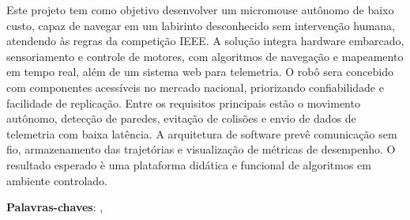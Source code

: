 \begin{resumo}
Este projeto tem como objetivo desenvolver um micromouse aut\^onomo de baixo custo, capaz de navegar em um labirinto desconhecido sem interven\c{c}\~ao humana, atendendo \`as regras da competi\c{c}\~ao IEEE. A solu\c{c}\~ao integra hardware embarcado, sensoriamento e controle de motores, com algoritmos de navega\c{c}\~ao e mapeamento em tempo real, al\'em de um sistema web para telemetria. O rob\^o sera concebido com componentes acess\'iveis no mercado nacional, priorizando confiabilidade e facilidade de replica\c{c}\~ao. Entre os requisitos principais est\~ao o movimento aut\^onomo, detec\c{c}\~ao de paredes, evita\c{c}\~ao de colis\~oes e envio de dados de telemetria com baixa lat\^encia. A arquitetura de software prev\^e comunica\c{c}\~ao sem fio, armazenamento das trajet\'orias e visualiza\c{c}\~ao de m\'etricas de desempenho. O resultado esperado \`e uma plataforma did\'atica e funcional de algoritmos em ambiente controlado.

\vspace{\onelineskip}
\noindent
\textbf{Palavras-chaves}: \imprimirpalavrachaveum, \imprimirpalavrachavedois
\end{resumo}


    
